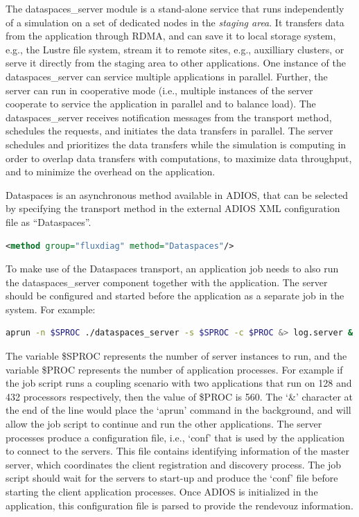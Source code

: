 The dataspaces\_server module is a stand-alone service that runs independently of a simulation 
on a set of dedicated nodes in the 
{\em staging area}. It transfers data from the application through RDMA,  
and can save it to local storage system, e.g., the Lustre file system, stream it to 
remote sites, e.g., auxilliary clusters, or serve it directly from the staging area to 
other applications. One instance of the dataspaces\_server can service multiple applications 
 in parallel. Further, the server can run in cooperative mode (i.e., multiple 
instances of the server cooperate to service the application in parallel and to balance 
load). The dataspaces\_server receives notification messages from the transport method, schedules 
the requests, and initiates the data transfers  in parallel. The 
server schedules and prioritizes the data transfers while the simulation is computing 
in order to overlap data transfers with computations, to maximize data throughput, 
and to minimize the overhead on the application.

Dataspaces is an asynchronous method available in ADIOS, that can be selected by specifying 
the transport method in the external ADIOS XML configuration file as ``Dataspaces''.

\begin{lstlisting}[language=XML, caption=Select Dataspaces as a transport method in the configuration file example.]
<method group="fluxdiag" method="Dataspaces"/>
\end{lstlisting}

To make use of the Dataspaces transport, an application job needs to also run the dataspaces\_server 
component together with the application. The server should be configured and started 
before the application as a separate job in the system. For example:

\begin{lstlisting}[language=bash, caption=Start the server component in a job file first.]
aprun -n $SPROC ./dataspaces_server -s $SPROC -c $PROC &> log.server &
\end{lstlisting}

The variable \$SPROC represents the number of server instances to run, and the 
variable \$PROC represents the number of application processes. For example if 
the job script runs a coupling scenario with two applications that run on 128 and 
432 processors respectively, then the value of \$PROC is 560. The `\&' character 
at the end of the line would place the `aprun' command in the background, and will 
allow the job script to continue and run the other applications. The server processes 
produce a configuration file, i.e., `conf' that is used by the application  
to connect to the servers. This file contains identifying information of the 
master server, which coordinates the client registration 
and discovery process. The job script should wait for the servers to start-up and 
produce the `conf' file before starting the client application processes. 
Once ADIOS is initialized in the application, this configuration file is parsed
to provide the rendevouz information. 

